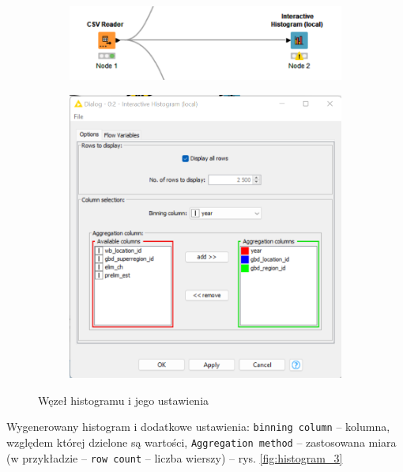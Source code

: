 \documentclass[11pt]{report}
\begin{document}
\begin{figure}
    \centering
    \begin{subfigure}{.5\textwidth}
        \centering
        \includegraphics[width=.9\linewidth]{histogram.png}
    \end{subfigure}%
    \begin{subfigure}{.5\textwidth}
        \centering
        \includegraphics[width=.9\linewidth]{histogram_2.png}
    \end{subfigure}
    \caption{Węzeł histogramu i jego ustawienia}
    \label{fig:histogram}
\end{figure}

Wygenerowany histogram i dodatkowe ustawienia: \texttt{binning column} -- kolumna, względem której dzielone są wartości, \texttt{Aggregation method} -- zastosowana miara (w przykładzie -- \texttt{row count} -- liczba wierszy) -- rys. \ref{fig:histogram_3}
\end{document}
